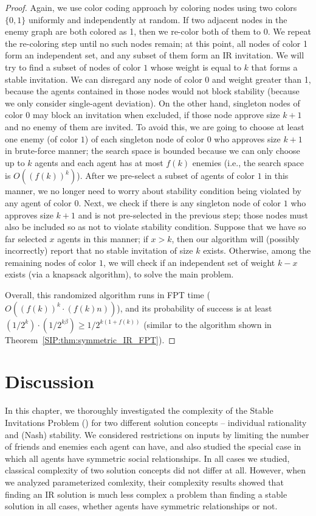 \begin{proof}
	Again, we use color coding approach by coloring nodes using two colors $\{0,1\}$ uniformly and independently at random. 
	If two adjacent nodes in the enemy graph are both colored as 1, then we re-color both of them to 0. 
	We repeat the re-coloring step until no such nodes remain; at this point, all nodes of color 1 form an independent set, and any subset of them form an IR invitation.
	We will try to find a subset of nodes of color $1$ whose weight is equal to $k$ that forms a stable invitation. We can disregard any node of color 0 and weight greater than 1, because the agents contained in those nodes would not block stability (because we only consider single-agent deviation).
	On the other hand, singleton nodes of color $0$ may block an invitation when excluded, if those node approve size $k+1$ and no enemy of them are invited. 
	To avoid this, we are going to choose at least one enemy (of color $1$) of each singleton node of color $0$ who approves size $k+1$ in brute-force manner; the search space is bounded because we can only choose up to $k$ agents and each agent has at most $f(k)$ enemies (i.e., the search space is $O((f(k))^k)$). After we pre-select a subset of agents of color $1$ in this manner, we no longer need to worry about stability condition being violated by any agent of color $0$. Next, we check if there is any singleton node of color $1$ who approves size $k+1$ and is not pre-selected in the previous step; those nodes must also be included so as not to violate stability condition. Suppose that we have so far selected $x$ agents in this manner; if $x > k$, then our algorithm will (possibly incorrectly) report that no stable invitation of size $k$ exists. Otherwise, among the remaining nodes of color $1$, we will check if an independent set of weight $k - x$ exists (via a knapsack algorithm), to solve the main problem.

		Overall, this randomized algorithm runs in FPT time ($O((f(k))^k \cdot (f(k)n))$), and its probability of success is at least $(1/2^k)\cdot (1/2^{k\beta}) \geq 1/2^{k(1+f(k))}$ (similar to the algorithm shown in Theorem~\ref{SIP:thm:symmetric_IR_FPT}).
		
\end{proof}



\section{Discussion} \label{SIP:sec:discussion}
In this chapter, we thoroughly investigated the complexity of the Stable Invitations Problem (\SIP) for two different solution concepts -- individual rationality and (Nash) stability. We considered restrictions on inputs by limiting the number of friends and enemies each agent can have, and also studied the special case in which all agents have symmetric social relationships. In all cases we studied, classical complexity of two solution concepts did not differ at all. However, when we analyzed parameterized comlexity, their complexity results showed that finding an IR solution is much less complex a problem than finding a stable solution in all cases, whether agents have symmetric relationships or not.

